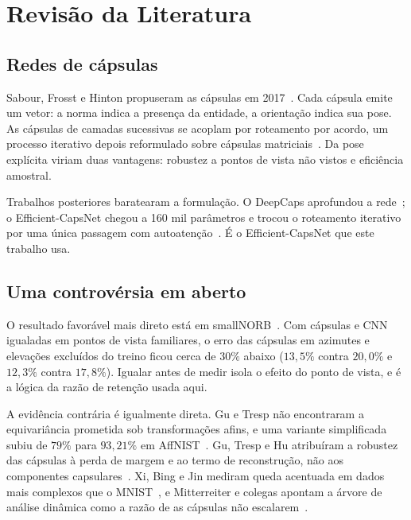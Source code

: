 \chapter{Revisão da Literatura}
\label{ch:revisao}

\section{Redes de cápsulas}
\label{sec:revisao:capsulas}

Sabour, Frosst e Hinton propuseram as cápsulas em 2017~\cite{sabour2017dynamic}.
Cada cápsula emite um vetor: a norma indica a presença da entidade, a orientação
indica sua pose. As cápsulas de camadas sucessivas se acoplam por roteamento por
acordo, um processo iterativo depois reformulado sobre cápsulas
matriciais~\cite{hinton2018matrix}. Da pose explícita viriam duas vantagens:
robustez a pontos de vista não vistos e eficiência amostral.

Trabalhos posteriores baratearam a formulação. O DeepCaps aprofundou a
rede~\cite{rajasegaran2019deepcaps}; o Efficient-CapsNet chegou a 160 mil
parâmetros e trocou o roteamento iterativo por uma única passagem com
autoatenção~\cite{mazzia2021efficient}. É o Efficient-CapsNet que este trabalho
usa.

\section{Uma controvérsia em aberto}
\label{sec:revisao:controversia}

O resultado favorável mais direto está em smallNORB~\cite{hinton2018matrix}.
Com cápsulas e CNN igualadas em pontos de vista familiares, o erro das cápsulas
em azimutes e elevações excluídos do treino ficou cerca de $30\%$ abaixo
($13{,}5\%$ contra $20{,}0\%$ e $12{,}3\%$ contra $17{,}8\%$). Igualar antes de
medir isola o efeito do ponto de vista, e é a lógica da razão de retenção usada
aqui.

A evidência contrária é igualmente direta. Gu e Tresp não encontraram a
equivariância prometida sob transformações afins, e uma variante simplificada
subiu de $79\%$ para $93{,}21\%$ em AffNIST~\cite{gu2020affine}. Gu, Tresp e Hu
atribuíram a robustez das cápsulas à perda de margem e ao termo de reconstrução,
não aos componentes capsulares~\cite{gu2021notrobust}. Xi, Bing e Jin mediram
queda acentuada em dados mais complexos que o MNIST~\cite{xi2017capsule}, e
Mitterreiter e colegas apontam a árvore de análise dinâmica como a razão de as
cápsulas não escalarem~\cite{mitterreiter2023scale}.

